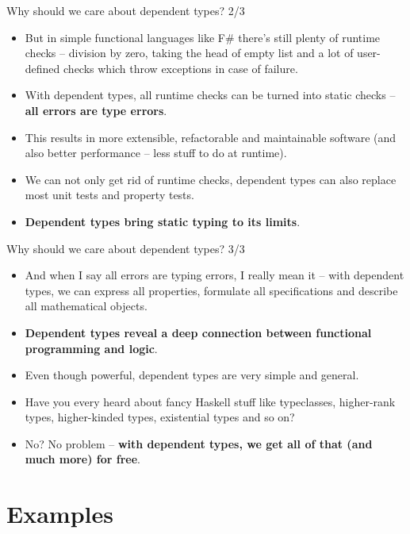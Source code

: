\documentclass{beamer}
\begin{document}
\begin{frame}{Why should we care about dependent types? 2/3}
\begin{itemize}
	\item But in simple functional languages like F\# there's still plenty of runtime checks -- division by zero, taking the head of empty list and a lot of user-defined checks which throw exceptions in case of failure.
	\item With dependent types, all runtime checks can be turned into static checks -- \textbf{all errors are type errors}.
	\item This results in more extensible, refactorable and maintainable software (and also better performance -- less stuff to do at runtime).\item We can not only get rid of runtime checks, dependent types can also replace most unit tests and property tests.
	\item \textbf{Dependent types bring static typing to its limits}.
\end{itemize}
\end{frame}

\begin{frame}{Why should we care about dependent types? 3/3}
\begin{itemize}
	\item And when I say all errors are typing errors, I really mean it -- with dependent types, we can express all properties, formulate all specifications and describe all mathematical objects.
	\item \textbf{Dependent types reveal a deep connection between functional programming and logic}.
	\item Even though powerful, dependent types are very simple and general.
	\item Have you every heard about fancy Haskell stuff like typeclasses, higher-rank types, higher-kinded types, existential types and so on?
	\item No? No problem -- \textbf{with dependent types, we get all of that (and much more) for free}.
\end{itemize}
\end{frame}

\section{Examples}
\end{document}
